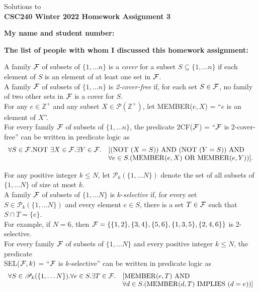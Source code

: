 \documentclass[11pt]{article}
\def\ints {{\mathbb Z}}
\newcommand{\Implies}{\mbox{ IMPLIES }}
\newcommand{\Or}{\mbox{ OR }}
\newcommand{\And}{\mbox{ AND }}
\newcommand{\Not}{\mbox{NOT }}
\newcommand{\Subsets}[1]{\mathscr{P}_{#1}(\{1,\ldots N\})}
\newcounter{ind}
\begin{document}
\begin{center}
Solutions to\\
{\bf \Large \bf CSC240 Winter 2022 Homework Assignment 3}
\end{center}

\begin{solution}
\noindent
{\bf My name and student number:}

\medskip

\noindent
{\bf The list of people with whom I discussed this homework assignment:}\\
\end{solution}


\begin{question}
A  family $\cal F$ of subsets of $\{1,\ldots n\}$ is a {\em cover} for a subset $S \subseteq \{1,\ldots n\}$ if each element of $S$ is an element of at least one set in $\cal F$.\\
A family $\cal F$ of subsets of $\{1,\ldots n\}$ is {\em 2-cover-free} if, for each set $S \in \cal F$,
no family of two other sets in $\cal F$ is a cover for $S$.\\

For any $e \in \ints^+$ and any subset $X \in {\mathcal P}(\ints^+)$, let MEMBER($e,X$) =  ``$e$ is an element of $X$''.\\
For every  family  $\cal F$ of subsets of $\{1,\ldots n\}$,
the predicate 2CF($\cal F$) = ``$\cal F$ is 2-cover-free'' can be written in predicate logic as
$$\begin{array}{ll}
\forall S \in {\cal F}. \Not \exists X \in {\cal F}. \exists Y \in {\cal F}. & [(\Not (X=S)) \And (\Not(Y=S)) \And \\
& \forall e \in S.({\rm MEMBER}(e,X) \Or {\rm MEMBER}(e,Y)) ].
\end{array}$$

For any positive integer $k\leq N$, let $\Subsets{k}$ denote the set of all
subsets of $\{1,\ldots N\}$ of size at most $k$.\\
A family ${\cal F}$ of subsets of $\{1,\ldots N\}$ is $k$-{\em selective} if, for every set $S \in \Subsets{k}$ and every element
$e \in S$, there is a set $T \in \cal F$ such that $S \cap T = \{e\}$.\\
For example, if $N = 6$, then ${\cal F} = \{\{1,2\},\{3,4\},\{5,6\},\{1,3,5\},\{2,4,6\}\}$ is 2-selective.\\

For every  family  $\cal F$ of subsets of $\{1,\ldots N\}$ and every positive integer $k\leq N$, the predicate\\
SEL(${\cal F},k)$ =  ``$\cal F$ is $k$-selective'' can be written in predicate logic as
$$\begin{array}{ll}
\forall S \in \Subsets{k}. \forall e \in S. \exists T \in {\cal F}. & [{\rm MEMBER}(e,T) \And\\
& \forall d \in S. ({\rm MEMBER}(d,T) \Implies (d=e))]
\end{array}$$


\end{question}
\end{document}
